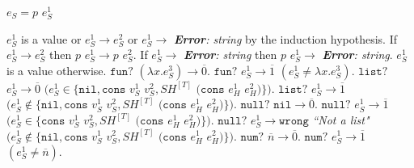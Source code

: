 \begin{case}

$e_{S}=p$ $e_{S}^{1}$

$e_{S}^{1}$ is a value or $e_{S}^{1}\rightarrow e_{S}^{2}$ or $e_{S}^{1}\rightarrow$ \emph{\textbf{Error}: string} by the induction hypothesis.  If $e_{S}^{1}\rightarrow e_{S}^{2}$ then $p$ $e_{S}^{1}\rightarrow p$ $e_{S}^{2}$.  If $e_{S}^{1}\rightarrow$ \emph{\textbf{Error}: string} then $p$ $e_{S}^{1}\rightarrow$ \emph{\textbf{Error}: string}.  $e_{S}^{1}$ is a value otherwise.  $\mathtt{fun?}$ $(\lambda x.e_{S}^{3})\rightarrow\overline{0}$.  $\mathtt{fun?}$ $e_{S}^{1}\rightarrow\overline{1}$ $(e_{S}^{1}\neq\lambda x.e_{S}^{3})$.  $\mathtt{list?}$ $e_{S}^{1}\rightarrow\overline{0}$ $(e_{S}^{1}\in\lbrace\mathtt{nil},\mathtt{cons}$ $v_{S}^{1}$ $v_{S}^{2},SH^{[T]}$ $(\mathtt{cons}$ $e_{H}^{1}$ $e_{H}^{2})\rbrace)$.  $\mathtt{list?}$ $e_{S}^{1}\rightarrow\overline{1}$ $(e_{S}^{1}\not\in\lbrace\mathtt{nil},\mathtt{cons}$ $v_{S}^{1}$ $v_{S}^{2},SH^{[T]}$ $(\mathtt{cons}$ $e_{H}^{1}$ $e_{H}^{2})\rbrace)$.  $\mathtt{null?}$ $\mathtt{nil}\rightarrow\overline{0}$.  $\mathtt{null?}$ $e_{S}^{1}\rightarrow\overline{1}$ $(e_{S}^{1}\in\lbrace\mathtt{cons}$ $v_{S}^{1}$ $v_{S}^{2},SH^{[T]}$ $(\mathtt{cons}$ $e_{H}^{1}$ $e_{H}^{2})\rbrace)$.  $\mathtt{null?}$ $e_{S}^{1}\rightarrow\mathtt{wrong}$ \emph{``Not a list"} $(e_{S}^{1}\not\in\lbrace\mathtt{nil},\mathtt{cons}$ $v_{S}^{1}$ $v_{S}^{2},SH^{[T]}$ $(\mathtt{cons}$ $e_{H}^{1}$ $e_{H}^{2})\rbrace)$.  $\mathtt{num?}$ $\overline{n}\rightarrow\overline{0}$.  $\mathtt{num?}$ $e_{S}^{1}\rightarrow\overline{1}$ $(e_{S}^{1}\neq\overline{n})$.

\end{case}